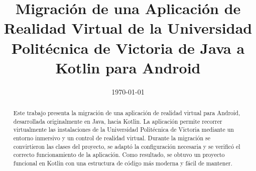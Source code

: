 \documentclass[conference]{IEEEtran}
\date{\specialdate\today}
\begin{document}
%
%
%

\newcommand{\breite}{1.0} %
\newcommand{\RelacionFiguradoscolumnas}{0.9}
\newcommand{\RelacionFiguradoscolumnasPuntoCinco}{0.45}




\title{Migración de una Aplicación de Realidad Virtual de la Universidad Politécnica de Victoria de Java a Kotlin para Android}

\author{
}



\maketitle

\begin{abstract} 
Este trabajo presenta la migración de una aplicación de realidad virtual para Android, desarrollada originalmente en Java, hacia Kotlin. La aplicación permite recorrer virtualmente las instalaciones de la Universidad Politécnica de Victoria mediante un entorno inmersivo y un control de realidad virtual. Durante la migración se convirtieron las clases del proyecto, se adaptó la configuración necesaria y se verificó el correcto funcionamiento de la aplicación. Como resultado, se obtuvo un proyecto funcional en Kotlin con una estructura de código más moderna y fácil de mantener.
\end{abstract}


\end{document}
